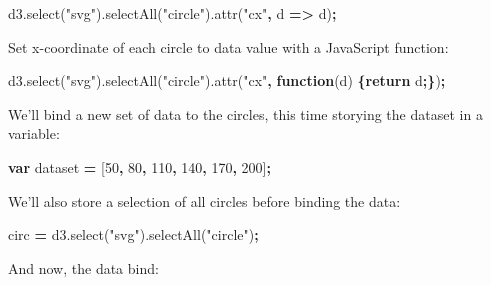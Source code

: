 \documentclass[openany]{book}
\newenvironment{Shaded}{\begin{snugshade}}{\end{snugshade}}
\newcommand{\AttributeTok}[1]{\textcolor[rgb]{0.77,0.63,0.00}{#1}}
\newcommand{\ControlFlowTok}[1]{\textcolor[rgb]{0.13,0.29,0.53}{\textbf{#1}}}
\newcommand{\DecValTok}[1]{\textcolor[rgb]{0.00,0.00,0.81}{#1}}
\newcommand{\KeywordTok}[1]{\textcolor[rgb]{0.13,0.29,0.53}{\textbf{#1}}}
\newcommand{\NormalTok}[1]{#1}
\newcommand{\OperatorTok}[1]{\textcolor[rgb]{0.81,0.36,0.00}{\textbf{#1}}}
\newcommand{\StringTok}[1]{\textcolor[rgb]{0.31,0.60,0.02}{#1}}
\newcommand{\VariableTok}[1]{\textcolor[rgb]{0.00,0.00,0.00}{#1}}
\begin{document}
\begin{Shaded}
\begin{Highlighting}[]
\VariableTok{d3}\NormalTok{.}\AttributeTok{select}\NormalTok{(}\StringTok{"svg"}\NormalTok{).}\AttributeTok{selectAll}\NormalTok{(}\StringTok{"circle"}\NormalTok{).}\AttributeTok{attr}\NormalTok{(}\StringTok{"cx"}\OperatorTok{,}\NormalTok{ d }\OperatorTok{=>}\NormalTok{ d)}\OperatorTok{;}
\end{Highlighting}
\end{Shaded}

Set x-coordinate of each circle to data value with a JavaScript function:

\begin{Shaded}
\begin{Highlighting}[]
\VariableTok{d3}\NormalTok{.}\AttributeTok{select}\NormalTok{(}\StringTok{"svg"}\NormalTok{).}\AttributeTok{selectAll}\NormalTok{(}\StringTok{"circle"}\NormalTok{).}\AttributeTok{attr}\NormalTok{(}\StringTok{"cx"}\OperatorTok{,} \KeywordTok{function}\NormalTok{(d) }\OperatorTok{\{}\ControlFlowTok{return}\NormalTok{ d}\OperatorTok{;\}}\NormalTok{)}\OperatorTok{;}
\end{Highlighting}
\end{Shaded}

We'll bind a new set of data to the circles, this time storying the dataset in a variable:

\begin{Shaded}
\begin{Highlighting}[]
\KeywordTok{var}\NormalTok{ dataset }\OperatorTok{=}\NormalTok{ [}\DecValTok{50}\OperatorTok{,} \DecValTok{80}\OperatorTok{,} \DecValTok{110}\OperatorTok{,} \DecValTok{140}\OperatorTok{,} \DecValTok{170}\OperatorTok{,} \DecValTok{200}\NormalTok{]}\OperatorTok{;}
\end{Highlighting}
\end{Shaded}

We'll also store a selection of all circles before binding the data:

\begin{Shaded}
\begin{Highlighting}[]
\NormalTok{circ }\OperatorTok{=} \VariableTok{d3}\NormalTok{.}\AttributeTok{select}\NormalTok{(}\StringTok{"svg"}\NormalTok{).}\AttributeTok{selectAll}\NormalTok{(}\StringTok{"circle"}\NormalTok{)}\OperatorTok{;}
\end{Highlighting}
\end{Shaded}

And now, the data bind:
\end{document}
